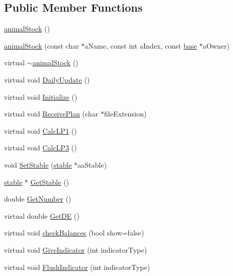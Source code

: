 \subsection*{Public Member Functions}
\begin{DoxyCompactItemize}
\item 
\hyperlink{classanimal_stock_a28ef4328fb75f96b307966450326d947}{animalStock} ()
\item 
\hyperlink{classanimal_stock_adf6f3e6e99c71676689dbbdf5b6e1ba3}{animalStock} (const char $\ast$aName, const int aIndex, const \hyperlink{classbase}{base} $\ast$aOwner)
\item 
virtual \hyperlink{classanimal_stock_a1b348cc4923dedf82ed04e3c65feb405}{$\sim$animalStock} ()
\item 
virtual void \hyperlink{classanimal_stock_ab95f31939d8d1cbc1bb2f567375995ae}{DailyUpdate} ()
\item 
virtual void \hyperlink{classanimal_stock_a6f4c6825f213b660f9c5cca109119a1c}{Initialize} ()
\item 
virtual void \hyperlink{classanimal_stock_a725a20b1ebac99314da9371c17aaad82}{ReceivePlan} (char $\ast$fileExtension)
\item 
virtual void \hyperlink{classanimal_stock_abc7609a0376b750c4d09918226ed60bf}{CalcLP1} ()
\item 
virtual void \hyperlink{classanimal_stock_a34875c064b430a79f94ab2b5aab34157}{CalcLP3} ()
\item 
void \hyperlink{classanimal_stock_a290892905be4b6f7e9efd445bdb37edd}{SetStable} (\hyperlink{classstable}{stable} $\ast$aaStable)
\item 
\hyperlink{classstable}{stable} $\ast$ \hyperlink{classanimal_stock_ac12cce9260301cb684af03c4d101d3ca}{GetStable} ()
\item 
double \hyperlink{classanimal_stock_af2cf60cd12ce0376947bb5e5adab751d}{GetNumber} ()
\item 
virtual double \hyperlink{classanimal_stock_a8bed676752d1e6414c9a73fe72e3cb85}{GetDE} ()
\item 
virtual void \hyperlink{classanimal_stock_aa52ee60094491bbcf82325fd5479f109}{checkBalances} (bool show=false)
\item 
virtual void \hyperlink{classanimal_stock_a7d6f9b68a88f2e5399f8dcdb3965a4f6}{GiveIndicator} (int indicatorType)
\item 
virtual void \hyperlink{classanimal_stock_a4801638201d8fa2c246eb4f9c28cf140}{FlushIndicator} (int indicatorType)
\end{DoxyCompactItemize}
